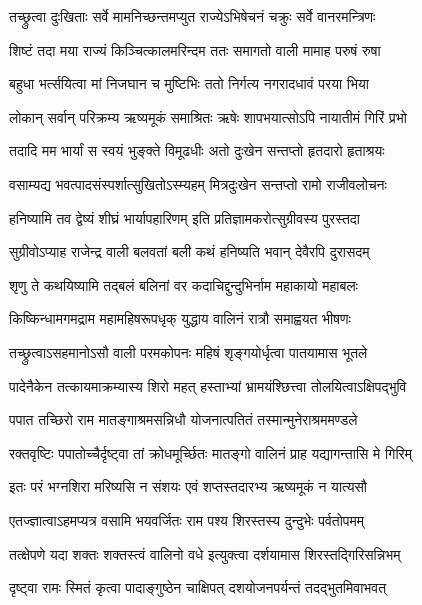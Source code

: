 \twolineshloka
{तच्छ्रुत्वा दुःखिताः सर्वे मामनिच्छन्तमप्युत}
{राज्येऽभिषेचनं चक्रुः सर्वे वानरमन्त्रिणः} %

\twolineshloka
{शिष्टं तदा मया राज्यं किञ्चित्कालमरिन्दम}
{ततः समागतो वाली मामाह परुषं रुषा} %

\twolineshloka
{बहुधा भर्त्सयित्वा मां निजघान च मुष्टिभिः}
{ततो निर्गत्य नगरादधावं परया भिया} %

\twolineshloka
{लोकान् सर्वान् परिक्रम्य ऋष्यमूकं समाश्रितः}
{ऋषेः शापभयात्सोऽपि नायातीमं गिरिं प्रभो} %

\twolineshloka
{तदादि मम भार्यां स स्वयं भुङ्क्ते विमूढधीः}
{अतो दुःखेन सन्तप्तो हृतदारो हृताश्रयः} %

\twolineshloka
{वसाम्यद्य भवत्पादसंस्पर्शात्सुखितोऽस्म्यहम्}
{मित्रदुःखेन सन्तप्तो रामो राजीवलोचनः} %

\twolineshloka
{हनिष्यामि तव द्वेष्यं शीघ्रं भार्यापहारिणम्}
{इति प्रतिज्ञामकरोत्सुग्रीवस्य पुरस्तदा} %

\twolineshloka
{सुग्रीवोऽप्याह राजेन्द्र वाली बलवतां बली}
{कथं हनिष्यति भवान् देवैरपि दुरासदम्} %

\twolineshloka
{शृणु ते कथयिष्यामि तद्बलं बलिनां वर}
{कदाचिद्दुन्दुभिर्नाम महाकायो महाबलः} %

\twolineshloka
{किष्किन्धामगमद्राम महामहिषरूपधृक्}
{युद्धाय वालिनं रात्रौ समाह्वयत भीषणः} %

\twolineshloka
{तच्छ्रुत्वाऽसहमानोऽसौ वाली परमकोपनः}
{महिषं शृङ्गयोर्धृत्वा पातयामास भूतले} %

\twolineshloka
{पादेनैकेन तत्कायमाक्रम्यास्य शिरो महत्}
{हस्ताभ्यां भ्रामयंश्छित्त्वा तोलयित्वाऽक्षिपद्भुवि} %

\twolineshloka
{पपात तच्छिरो राम मातङ्गाश्रमसन्निधौ}
{योजनात्पतितं तस्मान्मुनेराश्रममण्डले} %

\twolineshloka
{रक्तवृष्टिः पपातोच्चैर्दृष्ट्वा तां क्रोधमूर्च्छितः}
{मातङ्गो वालिनं प्राह यद्यागन्तासि मे गिरिम्} %

\twolineshloka
{इतः परं भग्नशिरा मरिष्यसि न संशयः}
{एवं शप्तस्तदारभ्य ऋष्यमूकं न यात्यसौ} %

\twolineshloka
{एतज्ज्ञात्वाऽहमप्यत्र वसामि भयवर्जितः}
{राम पश्य शिरस्तस्य दुन्दुभेः पर्वतोपमम्} %

\twolineshloka
{तत्क्षेपणे यदा शक्तः शक्तस्त्वं वालिनो वधे}
{इत्युक्त्वा दर्शयामास शिरस्तद्गिरिसन्निभम्} %

\twolineshloka
{दृष्ट्वा रामः स्मितं कृत्वा पादाङ्गुष्ठेन चाक्षिपत्}
{दशयोजनपर्यन्तं तदद्भुतमिवाभवत्} %

